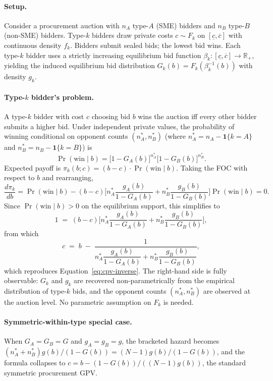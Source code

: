 \documentclass[12pt]{article}
\begin{document}
\paragraph{Setup.}
Consider a procurement auction with $n_A$ type-$A$ (SME) bidders
and $n_B$ type-$B$ (non-SME) bidders. Type-$k$ bidders draw
private costs $c \sim F_k$ on $[\underline{c}, \overline{c}]$
with continuous density $f_k$. Bidders submit sealed bids; the
lowest bid wins. Each type-$k$ bidder uses a strictly increasing
equilibrium bid function $\beta_k: [\underline{c}, \overline{c}]
\to \mathbb{R}_+$, yielding the induced equilibrium bid
distribution $G_k(b) = F_k(\beta_k^{-1}(b))$ with density $g_k$.

\paragraph{Type-$k$ bidder's problem.}
A type-$k$ bidder with cost $c$ choosing bid $b$ wins the auction
iff every other bidder submits a higher bid. Under independent
private values, the probability of winning conditional on
opponent counts $(n_A^*, n_B^*)$ (where $n_A^* = n_A - \mathbf{1}\{k=A\}$
and $n_B^* = n_B - \mathbf{1}\{k=B\}$) is
\[
\Pr(\text{win} \mid b) = \bigl[1 - G_A(b)\bigr]^{n_A^*}
\bigl[1 - G_B(b)\bigr]^{n_B^*}.
\]
Expected payoff is $\pi_k(b; c) = (b - c) \cdot \Pr(\text{win}
\mid b)$. Taking the FOC with respect to $b$ and rearranging,
\[
\frac{d \pi_k}{d b} = \Pr(\text{win} \mid b)
- (b - c) \biggl[ n_A^* \frac{g_A(b)}{1 - G_A(b)}
+ n_B^* \frac{g_B(b)}{1 - G_B(b)} \biggr]
\Pr(\text{win} \mid b) = 0.
\]
Since $\Pr(\text{win} \mid b) > 0$ on the equilibrium support,
this simplifies to
\[
1 \;=\; (b - c)
\biggl[ n_A^* \frac{g_A(b)}{1 - G_A(b)}
+ n_B^* \frac{g_B(b)}{1 - G_B(b)} \biggr],
\]
from which
\begin{equation}
c \;=\; b \;-\; \frac{1}{n_A^* \dfrac{g_A(b)}{1 - G_A(b)}
+ n_B^* \dfrac{g_B(b)}{1 - G_B(b)}},
\label{eq:app-cpv-inverse}
\end{equation}
which reproduces Equation~\eqref{eq:cpv-inverse}. The
right-hand side is fully observable: $G_k$ and $g_k$ are
recovered non-parametrically from the empirical distribution of
type-$k$ bids, and the opponent counts $(n_A^*, n_B^*)$ are
observed at the auction level. No parametric assumption on $F_k$
is needed.

\paragraph{Symmetric-within-type special case.}
When $G_A = G_B = G$ and $g_A = g_B = g$, the bracketed hazard
becomes $(n_A^* + n_B^*) g(b)/(1-G(b)) = (N-1) g(b)/(1-G(b))$,
and the formula collapses to $c = b - (1-G(b))/((N-1) g(b))$,
the standard \citet{gpv2000} symmetric procurement GPV.
\end{document}
